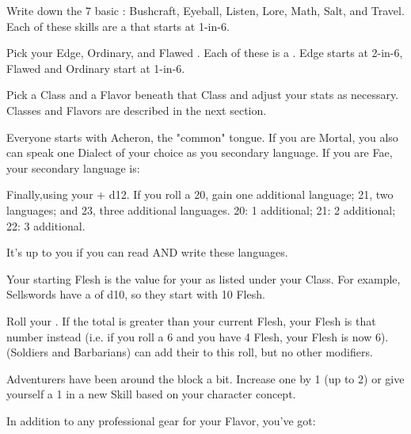 {  Write down the 7 basic : Bushcraft, Eyeball, Listen, Lore, Math, Salt, and Travel.  Each of these skills are a \KNACK that starts at 1-in-6.



  Pick your Edge, Ordinary, and Flawed .  Each of these is a \KNACK.  Edge starts at 2-in-6, Flawed and Ordinary start at 1-in-6.

  \cbreak
  

  Pick a Class and a Flavor beneath that Class and adjust your stats as necessary.  Classes and Flavors are described in the next section.



  Everyone starts with Acheron, the "common" tongue. If you are Mortal, you also can speak one Dialect of your choice as you secondary language.  If you are Fae, your secondary language is:

  Finally,\RO using your \INT + d12.  If you roll a 20, gain one additional language; 21, two languages; and 23, three additional languages. 20: 1 additional; 21: 2 additional; 22: 3 additional.

  It's up to you if you can read AND write these languages.



  Your starting Flesh is the \MAX value for your \HD as listed under your Class.  For example, Sellswords have a \HD of d10, so they start with 10 Flesh.  

  Roll your \VIG.  If the total is greater than your current Flesh, your Flesh is that number instead (i.e. if you roll a 6 and you have 4 Flesh, your Flesh is now 6).  (Soldiers and Barbarians) can add their \LVL to this roll, but no other modifiers.


  Adventurers have been around the block a bit.  Increase one  by 1 (up to 2) or give yourself a 1 in a new Skill based on your character concept.


  In addition to any professional gear for your Flavor, you've got:

\newpage
}